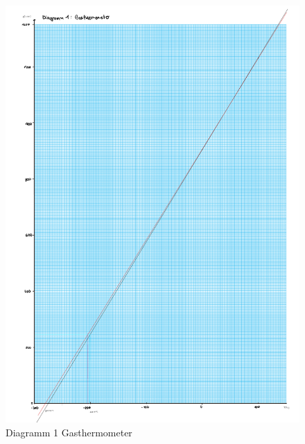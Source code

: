 \setcounter{equation}{3}
\begin{figure}[h!]
    \centering
    \includegraphics[page=1, width=.95\textwidth,]{41Dias.pdf}
    \caption{Diagramm 1 Gasthermometer}
\end{figure}
\newpage
